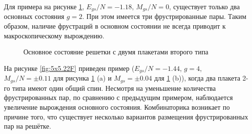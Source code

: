 \documentclass[utf8, babel, sor, jor, amsmath, amssymb, reprint]{elsarticle} %
\begin{document}
Для примера на рисунке \ref{fig:4x7}, $E_{gs}/N=-1.18$, $M_{gs}/N=0$, существует только два основных состояния $g=2$. При этом имеется три фрустрированные пары. Таким образом, наличие фрустраций в основном состоянии не всегда приводит к макроскопическому вырождению. 

\begin{figure}[H]
	\centering
	\caption{Основное состояние решетки с двумя плакетами второго типа}
	\label{fig:4x7}
\end{figure}

На рисунке \ref{fig:5x5.22F} приведен пример ($E_{gs}/N=-1.44$, $g=4$, $M_{gs}/N=\pm 0.11$ для рисунка \ref{fig:4x7} (a) и $M_{gs}=\pm 0.04$ для \ref{fig:4x7} (b)), когда два плакета 2-го типа имеют один общий спин. Несмотря на уменьшение количества фрустрированных пар, по сравнению с предыдущим примером, наблюдается увеличение вырождения основного состояния. Комбинаторика возникает по причине того, что существует несколько вариантов размещения фрустрированных пар на решётке.
\end{document}
